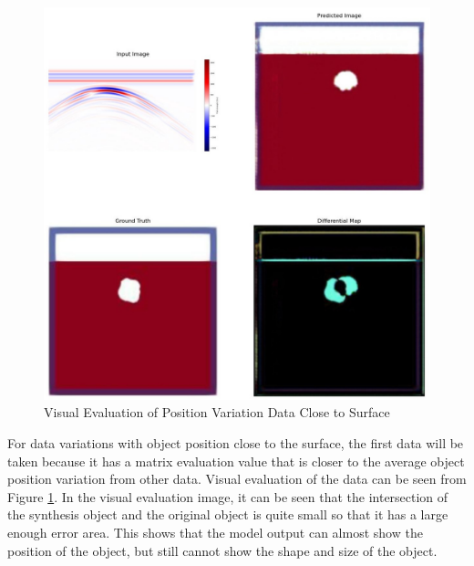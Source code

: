 \documentclass[conference]{IEEEtran}
\begin{document}
\begin{figure}[ht]
  \centering
  \includegraphics[scale=0.15]{gambar/diffMapDangkal.jpg}
  \caption{Visual Evaluation of Position Variation Data Close to Surface}
  \label{fig:diffmapdangkal}
\end{figure}

For data variations with object position close to the surface, the first data will be taken because it has a matrix evaluation value that is closer to the average object position variation from other data.
Visual evaluation of the data can be seen from Figure \ref{fig:diffmapdangkal}.
In the visual evaluation image, it can be seen that the intersection of the synthesis object and the original object is quite small so that it has a large enough error area.
This shows that the model output can almost show the position of the object, but still cannot show the shape and size of the object.
\end{document}
